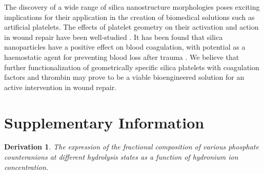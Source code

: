 \documentclass[a4paper,12pt,twocolumn]{article}
\newtheorem{thm}{Derivation} %
\begin{document}
	The discovery of a wide range of silica nanostructure morphologies poses exciting implications for their application in the creation of biomedical solutions such as artificial platelets. The effects of platelet geometry on their activation and action in wound repair have been well-studied \cite{sakurai2015,kita2011}. It has been found that silica nanoparticles have a positive effect on blood coagulation, with potential as a haemostatic agent for preventing blood loss after trauma \cite{gryshchuk2016}. We believe that further functionalization of geometrically specific silica platelets with coagulation factors and thrombin may prove to be a viable bioengineered solution for an active intervention in wound repair.
	
	\raggedbottom 
	\pagebreak
	\onecolumn
	\printbibliography
	
	\pagebreak
	
	\section*{Supplementary Information}

    \begin{thm}The expression of the fractional composition of various phosphate counteranions at different hydrolysis states as a function of hydronium ion concentration.
    \end{thm}
\end{document}
